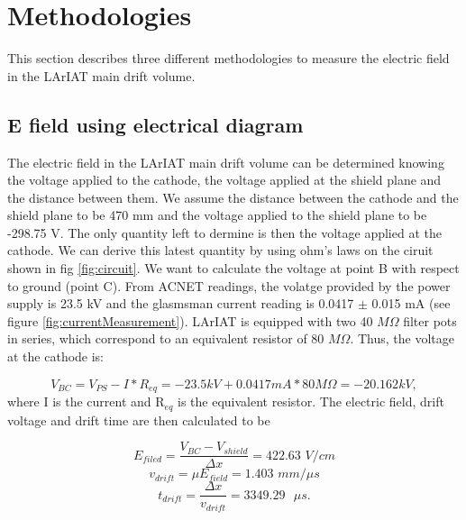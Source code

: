   

\clearpage
\newpage
\section{Methodologies}\label{sec:Methodologies}
This section describes three different methodologies to measure the electric field in the LArIAT main drift volume.  
\subsection{E field using electrical diagram}\label{sec:elDiagram}
The electric field in the LArIAT main drift volume can be determined knowing the voltage applied to the cathode, the voltage applied at the shield plane and the distance between them. We assume the distance between the cathode and the shield plane to be 470 mm and the voltage applied to the shield plane to be -298.75 V. The only quantity left to dermine is then the voltage applied at the cathode. We can derive this latest quantity by using ohm's laws on the ciruit shown in fig \ref{fig:circuit}. We want to calculate the voltage at point B with respect to ground (point C). From ACNET readings, the volatge provided by the power supply is 23.5 kV and the glasmsman current reading is 0.0417 $\pm$ 0.015 mA (see figure \ref{fig:currentMeasurement}). LArIAT is equipped with two 40 $M\Omega$ filter pots in series, which correspond to an equivalent resistor of 80 $M\Omega$. Thus, the voltage at the cathode is:

\begin{equation} V_{BC}=V_{PS} - I*R_{eq} = -23.5kV + 0.0417mA*80M\Omega = -20.162 kV, \label{eq:Efield}
\end{equation}
where I is the current and R$_{eq}$ is the equivalent resistor.
The electric field, drift voltage and drift time are then calculated to be

\begin{equation}E_{filed} = \frac{V_{BC} - V_{shield}}{\Delta x} = 422.63 \textit{ V/cm} 
\end{equation}
\begin{equation}v_{drift} = \mu E_{field} = 1.403 \textit{ mm/$\mu$s}
\end{equation}
\begin{equation}t_{drift} = \frac{\Delta x}{v_{drift}} = 3349.29 \textit{ $\mu$s.}
\end{equation}

